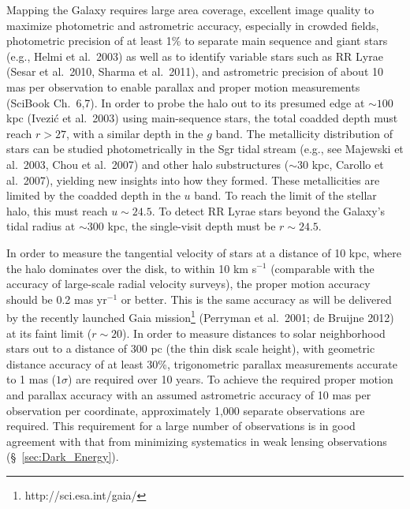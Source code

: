 \documentclass{emulateapj}
\begin{document}
Mapping the Galaxy requires large area coverage, excellent image
quality to maximize photometric and astrometric accuracy,
especially in crowded fields, photometric precision of at least 1\% to
separate main sequence and 
giant stars (e.g., Helmi et al.~2003) as well as to identify variable
stars such as RR Lyrae (Sesar et al.~2010, Sharma et al.~2011),
and astrometric precision of about 10 mas per observation to enable parallax and proper motion measurements 
(SciBook Ch.~6,7). In order to probe the halo out to its presumed edge at $\sim100$ kpc (Ivezi\'{c} et al.~2003) using
main-sequence stars, the total coadded depth must reach $r > 27$, with a similar depth in the $g$ band.   
The metallicity distribution of stars can be studied photometrically in the Sgr tidal stream (e.g., see 
Majewski et al.~2003, Chou et al.~2007) and other halo substructures
($\sim 30$ kpc, Carollo et al.~2007), yielding new insights into how
they formed.  These 
metallicities are limited by the coadded depth in the $u$ band.  To reach the limit of the stellar halo, this must reach 
$u\sim24.5$. To detect RR Lyrae stars beyond the Galaxy's tidal radius at $\sim 300$ kpc, the single-visit depth must 
be $r \sim  24.5$.

In order to measure the tangential velocity of stars at a distance of 10 kpc, where the halo dominates over the disk, to 
within 10 km s$^{-1}$ (comparable with the accuracy of
large-scale radial velocity surveys), the proper motion  
accuracy should be 0.2 mas yr$^{-1}$ or better. This is the same accuracy as will be delivered by the recently launched Gaia mission\footnote{http://sci.esa.int/gaia/} (Perryman et al.~2001; de Bruijne 2012) at its faint limit ($r \sim 20$). 
In order to measure distances to solar neighborhood stars out to a distance of 300 pc (the thin disk scale height), 
with geometric distance accuracy of at least 30\%, trigonometric parallax measurements accurate to 1 mas ($1\sigma$) 
are required over 10 years. To achieve the required proper motion and parallax accuracy with an assumed astrometric 
accuracy of 10 mas per observation per coordinate, approximately 1,000
separate observations are required. This requirement for a large
number of observations is in good agreement with that from minimizing
systematics in weak lensing observations (\S~\ref{sec:Dark_Energy}). 


\end{document}
